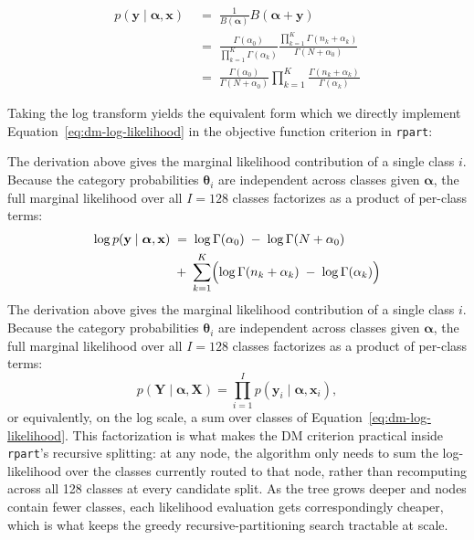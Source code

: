 \begin{equation}
    \begin{aligned}
    \label{eq:dm-likelihood}
    p(\mathbf{y} \mid  \boldsymbol{\alpha}, \mathbf{x}) 
    \;&=\;
    \frac{1}{B(\boldsymbol{\alpha})}B(\boldsymbol{\alpha} + \mathbf{y}) \\
    \;&=\;
    \frac{\Gamma(\alpha_0)}{\prod_{k=1}^K \Gamma(\alpha_k)}
    \frac{\prod_{k=1}^K \Gamma(n_k + \alpha_k)}{\Gamma(N + \alpha_0)} \\
    \;&=\;
    \frac{\Gamma(\alpha_0)}{\Gamma(N + \alpha_0)}
    \prod_{k=1}^K  \frac{\Gamma(n_k + \alpha_k)}{\Gamma(\alpha_k)}
    \end{aligned}
\end{equation}

Taking the log transform yields the equivalent form which we directly implement Equation~\ref{eq:dm-log-likelihood} in the objective function criterion in \texttt{rpart}: 

The derivation above gives the marginal likelihood contribution of a single class \(i\). Because the category probabilities \(\boldsymbol{\theta}_i\) are independent across classes given \(\boldsymbol{\alpha}\), the full marginal likelihood over all \(I=128\) classes factorizes as a product of per-class terms:
\begin{equation}
    \begin{aligned}
    \label{eq:dm-log-likelihood}
    \log p(\mathbf{y}\mid \boldsymbol{\alpha}, \mathbf{x})
    \;&=\;
    \log \Gamma(\alpha_0)
    \;-\;
    \log \Gamma(N + \alpha_0)\\
    \;&+\;
    \sum_{k=1}^K \Bigl(\log \Gamma(n_k + \alpha_k) \;-\; \log \Gamma(\alpha_k)
    \Bigr)
    \end{aligned}
\end{equation}
The derivation above gives the marginal likelihood contribution of a single class \(i\). Because the category probabilities \(\boldsymbol{\theta}_i\) are independent across classes given \(\boldsymbol{\alpha}\), the full marginal likelihood over all \(I=128\) classes factorizes as a product of per-class terms:
\begin{equation}
    \label{eq:dm-joint-likelihood}
    p(\mathbf{Y} \mid \boldsymbol{\alpha}, \mathbf{X}) = \prod_{i=1}^{I} p(\mathbf{y}_i \mid \boldsymbol{\alpha}, \mathbf{x}_i),
\end{equation}
or equivalently, on the log scale, a sum over classes of Equation~\ref{eq:dm-log-likelihood}. This factorization is what makes the DM criterion practical inside \texttt{rpart}'s recursive splitting: at any node, the algorithm only needs to sum the log-likelihood over the classes currently routed to that node, rather than recomputing across all 128 classes at every candidate split. As the tree grows deeper and nodes contain fewer classes, each likelihood evaluation gets correspondingly cheaper, which is what keeps the greedy recursive-partitioning search tractable at scale.

